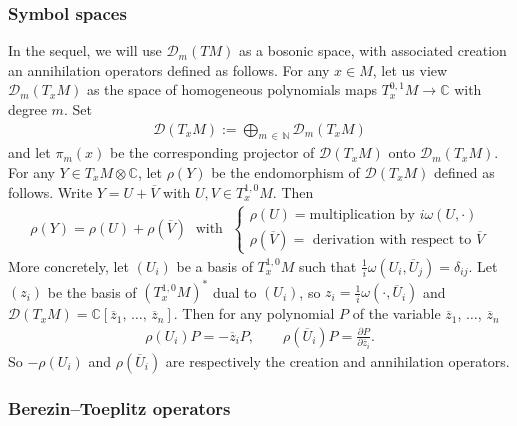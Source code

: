 \documentclass[10pt,a4paper]{article}
\theoremstyle{definition}
\numberwithin{equation}{section}
\newcommand{\N}{{\mathbb{N}}}
\newcommand{\C}{{\mathbb{C}}}
\newcommand{\om}{{\omega}}
\newcommand{\con}{\overline}
\newcommand{\D}{\mathcal{D}}
\begin{document}
\subsubsection{Symbol spaces}
In the sequel, we will use $\D_m (TM)$ as a bosonic space, with associated creation an annihilation operators defined as follows. For any $x \in M$, let us view $ \D_{m} (T_xM)$ as the space of homogeneous polynomials maps $T_x^{0,1} M \rightarrow \C$ with degree $m$. Set
\begin{gather}\label{eq:dtm_intro}
\D (T_xM) := \bigoplus_{m\,\in\,\N} \D_m (T_xM)
\end{gather}
and let $\pi_m(x)$ be the corresponding projector of $\D (T_x M)$ onto $\D_m (T_x M)$. For any $ Y
\in T_xM \otimes \C$, let $\rho (Y)$ be the endomorphism of $\D (T_xM)$ defined as follows. Write $Y = U + \con V$ with $U, V \in T_x ^{1,0} M$. Then
\begin{gather}\label{eq:rho}
\rho (Y)=
\rho (U) + \rho (\con V) \; \text{ with } \;
\begin{cases} \rho (U) = \text{
multiplication by } i
\om (U, \cdot) \\ \rho (\con {V}) = \text{ derivation with respect to } \con V
\end{cases}
\end{gather}
More concretely, let $(U_i)$ be a basis of $T^{1,0}_xM$ such that $\frac{1}{i} \om (U_i,
\con {U}_j) = \delta_{ij}$. Let $(z_i)$ be the basis of $(T^{1,0}_xM)^*$ dual to $(U_i)$, so $z_i = \frac{1}{i} \om (\cdot, \con{U}_i)$ and $ \D (T_x M) = \C [\con{z}_1, \,\ldots,\,\con{z}_n]$. Then for any polynomial $P$ of the variable $\con{z}_1$, $\ldots$, $\con{z}_n$
\begin{gather}
\rho (U_i) P = - \con{z}_i P, \qquad \rho (\con{U}_i) P = \frac{\partial P}{\partial
\con{z}_i}.
\end{gather}
So $-\rho (U_i)$ and $\rho (\con{U}_i)$ are respectively the creation and annihilation operators.

\subsubsection{Berezin--Toeplitz operators}
\end{document}
